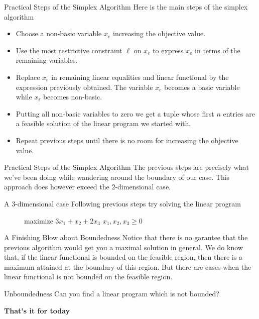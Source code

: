 \documentclass[32pt, aspectratio = 169]{beamer}
\begin{document}
\begin{frame}{Practical Steps of the Simplex Algorithm}
    Here is the main steps of the simplex algorithm
    \begin{itemize}
        \item[\textbullet] Choose a non-basic variable $x_e$ increasing the objective value.
        \item[\textbullet] Use the most restrictive constraint $\ell$ on $x_e$ to express $x_e$ in terms of the remaining variables.
        \item[\textbullet] Replace $x_e$ in remaining linear equalities and linear functional by the expression previously obtained. The variable $x_e$ becomes a basic variable while $x_\ell$ becomes non-basic.
        \item[\textbullet] Putting all non-basic variables to zero we get a tuple whose first $n$ entries are a feasible solution of the linear program we started with.
        \item[\textbullet] Repeat previous steps until there is no room for increasing the objective value.
    \end{itemize}
\end{frame}

\begin{frame}{Practical Steps of the Simplex Algorithm}
    The previous steps are precisely what we've been doing while wandering around the boundary of our case. This approach does however exceed the $2$-dimensional case.
    \begin{halfshyblock}{A $3$-dimensional case}
        Following previous steps try solving the linear program
         \begin{figure}
        \begin{linearProg}{
            maximize
            }{
            $3x_1 + x_2 + 2x_3 $
            }{
            }{
            $x_1, x_2, x_3 \geq 0 $
            }
        \end{linearProg}
    \end{figure}
    \end{halfshyblock}
\end{frame}
\begin{frame}{A Finishing Blow about Boundedness}
    Notice that there is no garantee that the previous algorithm would get you a maximal solution in general. We do know that, if the linear functional is bounded on the feasible region, then there is a maximum attained at the boundary of this region. But there are cases when the linear functional is not bounded on the feasible region.
    \begin{halfshyblock}{Unboundedness}
        Can you find a linear program which is not bounded?
    \end{halfshyblock}
\end{frame}

\begin{frame}
  \begin{center}
    {\huge \textbf{That's it for today}}
   \end{center}
 \end{frame}

\end{document}
